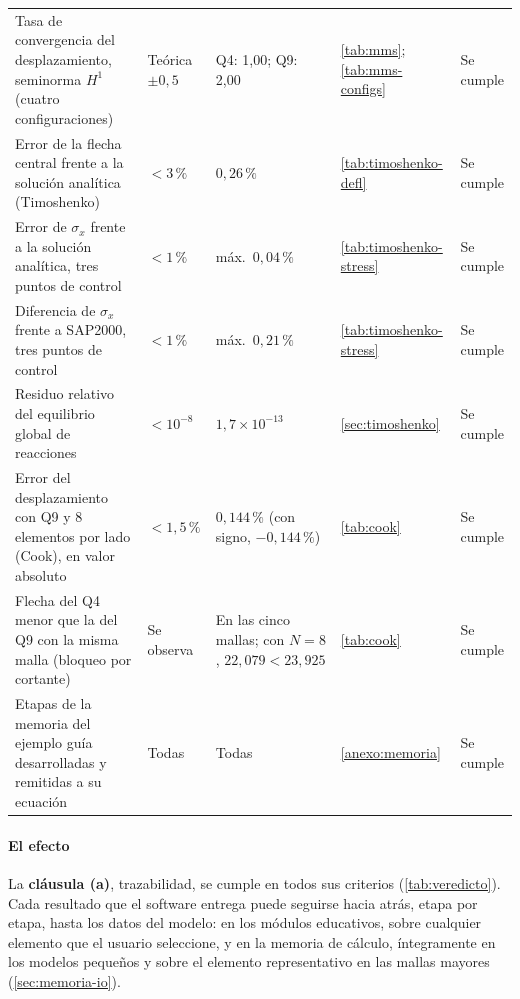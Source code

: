 {\begin{longtable}{@{}>{\raggedright\arraybackslash}p{4.2cm}>{\raggedright\arraybackslash}p{2.5cm}>{\raggedright\arraybackslash}p{3.5cm}>{\raggedright\arraybackslash}p{2.6cm}>{\raggedright\arraybackslash}p{1.9cm}@{}}
Tasa de convergencia del desplazamiento, seminorma $H^1$ (cuatro configuraciones) & Teórica $\pm 0{,}5$ & Q4: 1,00; Q9: 2,00 & \autoref{tab:mms}; \autoref{tab:mms-configs} & Se cumple \\
Error de la flecha central frente a la solución analítica (Timoshenko) & $< 3\,\%$ & $0{,}26\,\%$ & \autoref{tab:timoshenko-defl} & Se cumple \\
Error de $\sigma_x$ frente a la solución analítica, tres puntos de control & $< 1\,\%$ & máx.\ $0{,}04\,\%$ & \autoref{tab:timoshenko-stress} & Se cumple \\
Diferencia de $\sigma_x$ frente a SAP2000, tres puntos de control & $< 1\,\%$ & máx.\ $0{,}21\,\%$ & \autoref{tab:timoshenko-stress} & Se cumple \\
Residuo relativo del equilibrio global de reacciones & $< 10^{-8}$ & $1{,}7\times10^{-13}$ & \autoref{sec:timoshenko} & Se cumple \\
Error del desplazamiento con Q9 y 8 elementos por lado (Cook), en valor absoluto & $< 1{,}5\,\%$ & $0{,}144\,\%$ (con signo, $-0{,}144\,\%$) & \autoref{tab:cook} & Se cumple \\
Flecha del Q4 menor que la del Q9 con la misma malla (bloqueo por cortante) & Se observa & En las cinco mallas; con $N=8$, $22{,}079 < 23{,}925$ & \autoref{tab:cook} & Se cumple \\
Etapas de la memoria del ejemplo guía desarrolladas y remitidas a su ecuación & Todas & Todas & \autoref{anexo:memoria} & Se cumple \\
\end{longtable}}
{\singlespacing{}}

\paragraph{El efecto} La \textbf{cláusula (a)}, trazabilidad, se cumple en todos sus criterios (\autoref{tab:veredicto}). Cada resultado que el software entrega puede seguirse hacia atrás, etapa por etapa, hasta los datos del modelo: en los módulos educativos, sobre cualquier elemento que el usuario seleccione, y en la memoria de cálculo, íntegramente en los modelos pequeños y sobre el elemento representativo en las mallas mayores (\autoref{sec:memoria-io}).

